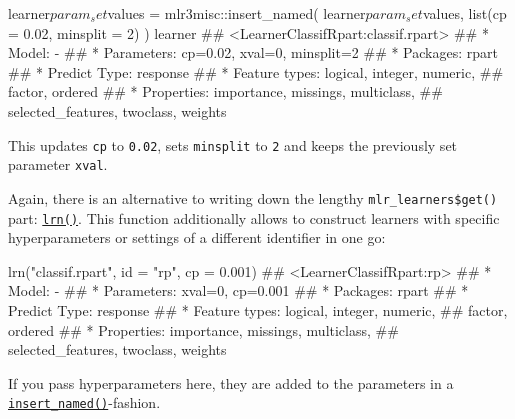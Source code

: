 \documentclass[]{article}
\newenvironment{Shaded}{}{}
\newcommand{\DataTypeTok}[1]{#1}
\newcommand{\DecValTok}[1]{#1}
\newcommand{\FloatTok}[1]{#1}
\newcommand{\KeywordTok}[1]{\textcolor[rgb]{0.00,0.00,1.00}{#1}}
\newcommand{\NormalTok}[1]{#1}
\newcommand{\OperatorTok}[1]{#1}
\newcommand{\StringTok}[1]{\textcolor[rgb]{0.00,0.50,0.50}{#1}}
\renewenvironment{Shaded} {\begin{snugshade}\small} {\end{snugshade}}
\begin{document}
\begin{Shaded}
\begin{Highlighting}[]
\NormalTok{learner}\OperatorTok{$}\NormalTok{param_set}\OperatorTok{$}\NormalTok{values =}\StringTok{ }\NormalTok{mlr3misc}\OperatorTok{::}\KeywordTok{insert_named}\NormalTok{(}
\NormalTok{  learner}\OperatorTok{$}\NormalTok{param_set}\OperatorTok{$}\NormalTok{values,}
  \KeywordTok{list}\NormalTok{(}\DataTypeTok{cp =} \FloatTok{0.02}\NormalTok{, }\DataTypeTok{minsplit =} \DecValTok{2}\NormalTok{)}
\NormalTok{)}
\NormalTok{learner}
\NormalTok{## <LearnerClassifRpart:classif.rpart>}
\NormalTok{## * Model: -}
\NormalTok{## * Parameters: cp=0.02, xval=0, minsplit=2}
\NormalTok{## * Packages: rpart}
\NormalTok{## * Predict Type: response}
\NormalTok{## * Feature types: logical, integer, numeric,}
\NormalTok{##   factor, ordered}
\NormalTok{## * Properties: importance, missings, multiclass,}
\NormalTok{##   selected_features, twoclass, weights}
\end{Highlighting}
\end{Shaded}

This updates \texttt{cp} to \texttt{0.02}, sets \texttt{minsplit} to \texttt{2} and keeps the previously set parameter \texttt{xval}.

Again, there is an alternative to writing down the lengthy \texttt{mlr\_learners\$get()} part: \href{https://mlr3.mlr-org.com/reference/mlr_sugar.html}{\texttt{lrn()}}.
This function additionally allows to construct learners with specific hyperparameters or settings of a different identifier in one go:

\begin{Shaded}
\begin{Highlighting}[]
\KeywordTok{lrn}\NormalTok{(}\StringTok{"classif.rpart"}\NormalTok{, }\DataTypeTok{id =} \StringTok{"rp"}\NormalTok{, }\DataTypeTok{cp =} \FloatTok{0.001}\NormalTok{)}
\NormalTok{## <LearnerClassifRpart:rp>}
\NormalTok{## * Model: -}
\NormalTok{## * Parameters: xval=0, cp=0.001}
\NormalTok{## * Packages: rpart}
\NormalTok{## * Predict Type: response}
\NormalTok{## * Feature types: logical, integer, numeric,}
\NormalTok{##   factor, ordered}
\NormalTok{## * Properties: importance, missings, multiclass,}
\NormalTok{##   selected_features, twoclass, weights}
\end{Highlighting}
\end{Shaded}

If you pass hyperparameters here, they are added to the parameters in a \href{https://mlr3misc.mlr-org.com/reference/insert_named.html}{\texttt{insert\_named()}}-fashion.
\end{document}
